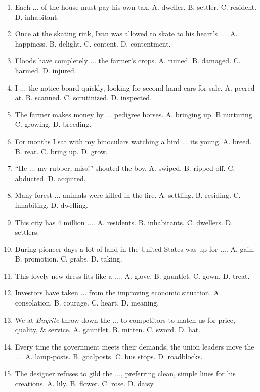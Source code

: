 \documentclass{article}
\numberwithin{equation}{section}
\begin{document}
\begin{enumerate}[leftmargin=8mm]
	\item Each $\ldots$ of the house must pay his own tax. {\sf A.} dweller. {\sf B.} settler. {\sf C.} resident. {\sf D.} inhabitant.
	\item Once at the skating rink, Ivan was allowed to skate to his heart's $\ldots$. {\sf A.} happiness. {\sf B.} delight. {\sf C.} content. {\sf D.} contentment.
	\item Floods have completely $\ldots$ the farmer's crops. {\sf A.} ruined. {\sf B.} damaged. {\sf C.} harmed. {\sf D.} injured.
	\item I $\ldots$ the notice-board quickly, looking for second-hand cars for sale. {\sf A.} peered at. {\sf B.} scanned. {\sf C.} scrutinized. {\sf D.} inspected.
	\item The farmer makes money by $\ldots$ pedigree horses. {\sf A.} bringing up. B nurturing. {\sf C.} growing. {\sf D.} breeding.
	\item For months I sat with my binoculars watching a bird $\ldots$ its young. {\sf A.} breed. {\sf B.} rear. {\sf C.} bring up. {\sf D.} grow.
	\item ``He $\ldots$ my rubber, miss!'' shouted the boy. {\sf A.} swiped. {\sf B.} ripped off. {\sf C.} abducted. {\sf D.} acquired.
	\item Many forest-$\ldots$ animals were killed in the fire. {\sf A.} settling. {\sf B.} residing. {\sf C.} inhabiting. {\sf D.} dwelling.
	\item This city has 4 million $\ldots$. {\sf A.} residents. {\sf B.} inhabitants. {\sf C.} dwellers. {\sf D.} settlers.
	\item During pioneer days a lot of land in the United States was up for $\ldots$. {\sf A.} gain. {\sf B.} promotion. {\sf C.} grabs. {\sf D.} taking.
	\item This lovely new dress fits like a $\ldots$. {\sf A.} glove. {\sf B.} gauntlet. {\sf C.} gown. {\sf D.} treat.
	\item Investors have taken $\ldots$ from the improving economic situation. {\sf A.} consolation. {\sf B.} courage. {\sf C.} heart. {\sf D.} meaning.
	\item We at \textit{Buyrite} throw down the $\ldots$ to competitors to match us for price, quality, \& service. {\sf A.} gauntlet. {\sf B.} mitten. {\sf C.} sword. {\sf D.} hat.
	\item Every time the government meets their demands, the union leaders move the $\ldots$. {\sf A.} lamp-posts. {\sf B.} goalposts. {\sf C.} bus stops. {\sf D.} roadblocks.
	\item The designer refuses to gild the $\ldots$, preferring clean, simple lines for his creations. {\sf A.} lily. {\sf B.} flower. {\sf C.} rose. {\sf D.} daisy.

\end{enumerate}
\end{document}
